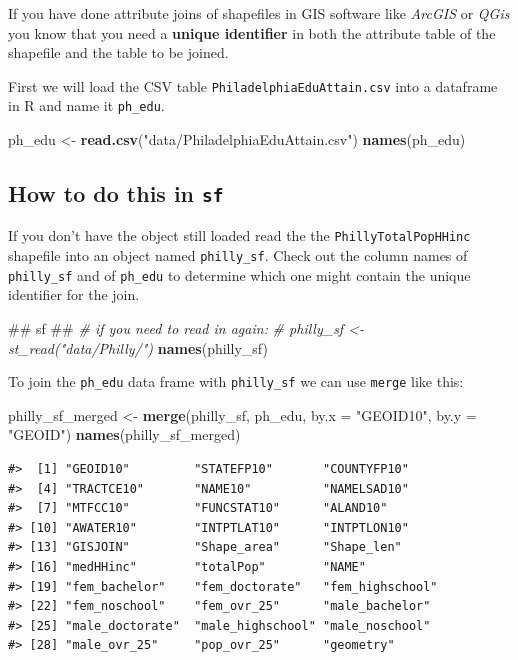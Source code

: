 \documentclass[]{book}
\newenvironment{Shaded}{\begin{snugshade}}{\end{snugshade}}
\newcommand{\KeywordTok}[1]{\textcolor[rgb]{0.13,0.29,0.53}{\textbf{#1}}}
\newcommand{\DataTypeTok}[1]{\textcolor[rgb]{0.13,0.29,0.53}{#1}}
\newcommand{\StringTok}[1]{\textcolor[rgb]{0.31,0.60,0.02}{#1}}
\newcommand{\CommentTok}[1]{\textcolor[rgb]{0.56,0.35,0.01}{\textit{#1}}}
\newcommand{\NormalTok}[1]{#1}
\begin{document}
If you have done attribute joins of shapefiles in GIS software like
\emph{ArcGIS} or \emph{QGis} you know that you need a \textbf{unique
identifier} in both the attribute table of the shapefile and the table
to be joined.

First we will load the CSV table \texttt{PhiladelphiaEduAttain.csv} into
a dataframe in R and name it \texttt{ph\_edu}.

\begin{Shaded}
\begin{Highlighting}[]
\NormalTok{ph_edu <-}\StringTok{ }\KeywordTok{read.csv}\NormalTok{(}\StringTok{"data/PhiladelphiaEduAttain.csv"}\NormalTok{)}
\KeywordTok{names}\NormalTok{(ph_edu)}
\end{Highlighting}
\end{Shaded}

\subsection{\texorpdfstring{How to do this in
\texttt{sf}}{How to do this in sf}}\label{how-to-do-this-in-sf-1}

If you don't have the object still loaded read the the
\texttt{PhillyTotalPopHHinc} shapefile into an object named
\texttt{philly\_sf}. Check out the column names of \texttt{philly\_sf}
and of \texttt{ph\_edu} to determine which one might contain the unique
identifier for the join.

\begin{Shaded}
\begin{Highlighting}[]
\NormalTok{## sf ##}
\CommentTok{# if you need to read in again:}
\CommentTok{# philly_sf <- st_read("data/Philly/")}
\KeywordTok{names}\NormalTok{(philly_sf)}
\end{Highlighting}
\end{Shaded}

To join the \texttt{ph\_edu} data frame with \texttt{philly\_sf} we can
use \texttt{merge} like this:

\begin{Shaded}
\begin{Highlighting}[]
\NormalTok{philly_sf_merged <-}\StringTok{ }\KeywordTok{merge}\NormalTok{(philly_sf, ph_edu, }\DataTypeTok{by.x =} \StringTok{"GEOID10"}\NormalTok{, }\DataTypeTok{by.y =} \StringTok{"GEOID"}\NormalTok{)}
\KeywordTok{names}\NormalTok{(philly_sf_merged) }
\end{Highlighting}
\end{Shaded}

\begin{verbatim}
#>  [1] "GEOID10"         "STATEFP10"       "COUNTYFP10"     
#>  [4] "TRACTCE10"       "NAME10"          "NAMELSAD10"     
#>  [7] "MTFCC10"         "FUNCSTAT10"      "ALAND10"        
#> [10] "AWATER10"        "INTPTLAT10"      "INTPTLON10"     
#> [13] "GISJOIN"         "Shape_area"      "Shape_len"      
#> [16] "medHHinc"        "totalPop"        "NAME"           
#> [19] "fem_bachelor"    "fem_doctorate"   "fem_highschool" 
#> [22] "fem_noschool"    "fem_ovr_25"      "male_bachelor"  
#> [25] "male_doctorate"  "male_highschool" "male_noschool"  
#> [28] "male_ovr_25"     "pop_ovr_25"      "geometry"
\end{verbatim}
\end{document}
